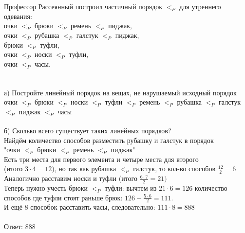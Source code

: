 \documentclass{article}
\begin{document}
\section{}
Профессор Рассеянный построил частичный порядок $<_P$ для утреннего одевания:\\
очки $<_P$ брюки $<_P$ ремень $<_P$ пиджак,\\
очки $<_P$ рубашка $<_P$ галстук $<_P$ пиджак,\\
брюки $<_P$ туфли,\\
очки $<_P$ носки $<_P$ туфли,\\
очки $<_P$ часы.\\
\\\\
а) Постройте линейный порядок на вещах, не нарушаемый исходный порядок\\
очки $<_P$ брюки $<_P$ носки $<_P$ туфли $<_P$ ремень $<_P$ рубашка $<_P$ галстук $<_P$ пиджак $<_P$ часы\\\\
б) Сколько всего существует таких линейных порядков?\\
Найдём количество способов разместить рубашку и галстук в порядок \\"очки $<_P$ брюки $<_P$ ремень $<_P$ пиджак"\\
Есть три места для первого элемента и четыре места для второго\\(итого $3\cdot4=12$), но так как рубашка $<_P$ галстук, то кол-во способов $\frac{12}{2} = 6$\\
Аналогично расставим носки и туфли (итого $\frac{6\cdot7}{2}=21)$\\
Теперь нужно учесть брюки $<_P$ туфли: вычтем из $21\cdot6=126$ количество способов где туфли стоят раньше брюк: $126-\frac{5\cdot6}{2}=111$.\\
И ещё 8 способок расставить часы, следовательно: $111\cdot8=888$\\\\
Ответ: 888
\end{document}
